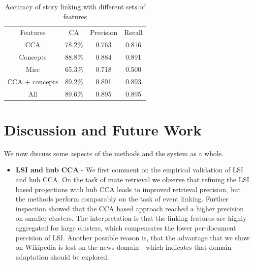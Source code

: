 \documentclass[twoside,11pt]{article}
\begin{document}
\begin{table}[h]
\caption{Accuracy of story linking with different sets of features}
\label{table:linkingEval}
\begin{center}
\begin{tabular}{|c|c|c|c|}
  \hline
  \cline{1-4}
  Features & CA & Precision & Recall \\ \cline{1-4}
  CCA & 78.2\% & 0.763 & 0.816 \\ \cline{1-4}
  Concepts & 88.8\% & 0.884 & 0.891 \\ \cline{1-4}
  Misc & 65.3\% & 0.718 & 0.500 \\ \cline{1-4}
  CCA + concepts & 89.2\% & 0.891 & 0.893 \\ \cline{1-4}
  All & 89.6\% & 0.895 & 0.895 \\ \cline{1-4}
  \hline
\end{tabular}
\end{center}
\end{table}


\section{Discussion and Future Work}

We now discuss some aspects of the methods and the system as a whole.
\begin{itemize}
\item \textbf{LSI and hub CCA} - We first comment on the empirical validation of LSI and hub CCA. On the task of mate retrieval we observe that refining the LSI based projections with hub CCA leads to improved retrieval precision, but the methods perform comparably on the task of event linking. Further inspection showed that the CCA based approach reached a higher precision on smaller clusters. The interpretation is that the linking features are highly aggregated for large clusters, which compensates the lower per-document percision of LSI. Another possible reason is, that the advantage that we show on Wikipedia is lost on the news domain - which indicates that domain adaptation should be explored.

\end{itemize}
\end{document}
